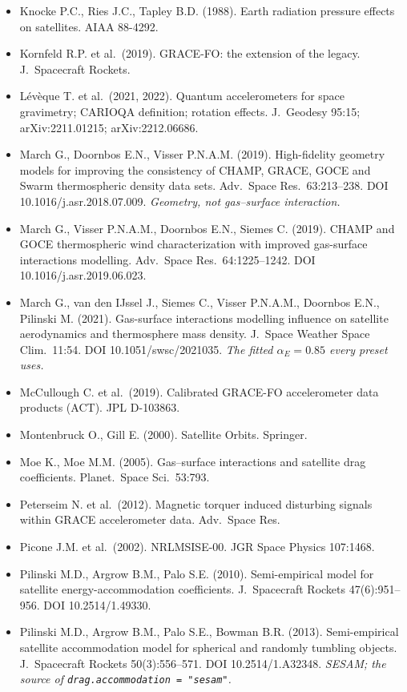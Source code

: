 \begin{itemize}[nosep,leftmargin=*]
\item Knocke P.C., Ries J.C., Tapley B.D. (1988). Earth radiation pressure effects on satellites. AIAA 88-4292.
\item Kornfeld R.P. et al.\ (2019). GRACE-FO: the extension of the legacy. J.\ Spacecraft Rockets.
\item Lévèque T. et al.\ (2021, 2022). Quantum accelerometers for space gravimetry; CARIOQA definition; rotation effects. J.\ Geodesy 95:15; arXiv:2211.01215; arXiv:2212.06686.
\item March G., Doornbos E.N., Visser P.N.A.M. (2019). High-fidelity geometry models for improving the consistency of CHAMP, GRACE, GOCE and Swarm thermospheric density data sets. Adv.\ Space Res.\ 63:213--238. DOI 10.1016/j.asr.2018.07.009. \emph{Geometry, not gas--surface interaction.}
\item March G., Visser P.N.A.M., Doornbos E.N., Siemes C. (2019). CHAMP and GOCE thermospheric wind characterization with improved gas-surface interactions modelling. Adv.\ Space Res.\ 64:1225--1242. DOI 10.1016/j.asr.2019.06.023.
\item March G., van den IJssel J., Siemes C., Visser P.N.A.M., Doornbos E.N., Pilinski M. (2021). Gas-surface interactions modelling influence on satellite aerodynamics and thermosphere mass density. J.\ Space Weather Space Clim.\ 11:54. DOI 10.1051/swsc/2021035. \emph{The fitted $\alpha_E=0.85$ every preset uses.}
\item McCullough C. et al.\ (2019). Calibrated GRACE-FO accelerometer data products (ACT). JPL D-103863.
\item Montenbruck O., Gill E. (2000). Satellite Orbits. Springer.
\item Moe K., Moe M.M. (2005). Gas--surface interactions and satellite drag coefficients. Planet.\ Space Sci.\ 53:793.
\item Peterseim N. et al.\ (2012). Magnetic torquer induced disturbing signals within GRACE accelerometer data. Adv.\ Space Res.
\item Picone J.M. et al.\ (2002). NRLMSISE-00. JGR Space Physics 107:1468.
\item Pilinski M.D., Argrow B.M., Palo S.E. (2010). Semi-empirical model for satellite energy-accommodation coefficients. J.\ Spacecraft Rockets 47(6):951--956. DOI 10.2514/1.49330.
\item Pilinski M.D., Argrow B.M., Palo S.E., Bowman B.R. (2013). Semi-empirical satellite accommodation model for spherical and randomly tumbling objects. J.\ Spacecraft Rockets 50(3):556--571. DOI 10.2514/1.A32348. \emph{SESAM; the source of \texttt{drag.accommodation = "sesam"}.}

\end{itemize}
